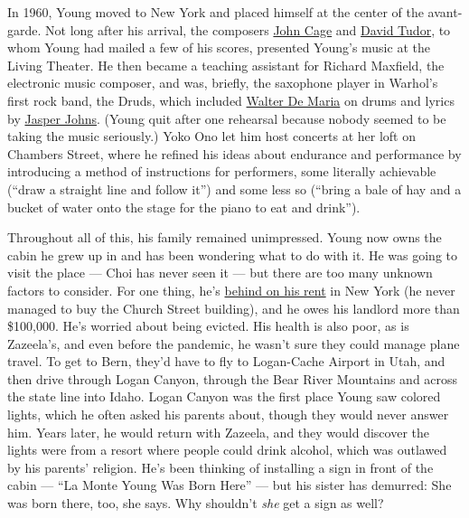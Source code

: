 In 1960, Young moved to New York and placed himself at the center of the
avant-garde. Not long after his arrival, the composers
\href{https://www.nytimes.com/topic/person/john-cage}{John Cage} and
\href{https://www.nytimes.com/1996/08/15/arts/david-tudor-70-electronic-composer-dies.html}{David
Tudor}, to whom Young had mailed a few of his scores, presented Young's
music at the Living Theater. He then became a teaching assistant for
Richard Maxfield, the electronic music composer, and was, briefly, the
saxophone player in Warhol's first rock band, the Druds, which included
\href{https://www.nytimes.com/2013/07/27/arts/design/walter-de-maria-artist-on-grand-scale-dies-at-77.html}{Walter
De Maria} on drums and lyrics by
\href{https://www.nytimes.com/2019/02/18/t-magazine/jasper-johns.html}{Jasper
Johns}. (Young quit after one rehearsal because nobody seemed to be
taking the music seriously.) Yoko Ono let him host concerts at her loft
on Chambers Street, where he refined his ideas about endurance and
performance by introducing a method of instructions for performers, some
literally achievable (``draw a straight line and follow it'') and some
less so (``bring a bale of hay and a bucket of water onto the stage for
the piano to eat and drink'').

Throughout all of this, his family remained unimpressed. Young now owns
the cabin he grew up in and has been wondering what to do with it. He
was going to visit the place --- Choi has never seen it --- but there
are too many unknown factors to consider. For one thing, he's
\href{https://charity.gofundme.com/o/en/campaign/save-the-dream-house-keep-our-dream-alive}{behind
on his rent} in New York (he never managed to buy the Church Street
building), and he owes his landlord more than \$100,000. He's worried
about being evicted. His health is also poor, as is Zazeela's, and even
before the pandemic, he wasn't sure they could manage plane travel. To
get to Bern, they'd have to fly to Logan-Cache Airport in Utah, and then
drive through Logan Canyon, through the Bear River Mountains and across
the state line into Idaho. Logan Canyon was the first place Young saw
colored lights, which he often asked his parents about, though they
would never answer him. Years later, he would return with Zazeela, and
they would discover the lights were from a resort where people could
drink alcohol, which was outlawed by his parents' religion. He's been
thinking of installing a sign in front of the cabin --- ``La Monte Young
Was Born Here'' --- but his sister has demurred: She was born there,
too, she says. Why shouldn't \emph{she} get a sign as well?

